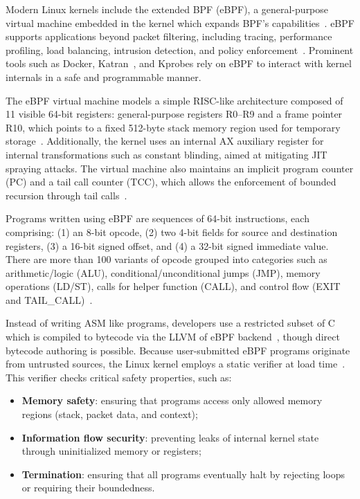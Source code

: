 \documentclass[sigconf]{acmart}
\begin{document}
Modern Linux kernels include the extended BPF (eBPF), a general-purpose virtual machine embedded in the kernel which expands BPF's capabilities~\cite{santos2019fast}. eBPF supports applications beyond packet filtering, including tracing, performance profiling, load balancing, intrusion detection, and policy enforcement~\cite{rice2023learning}. Prominent tools such as Docker, Katran~\cite{Katran}, and Kprobes rely on eBPF to interact with kernel internals in a safe and programmable manner.

The eBPF virtual machine models a simple RISC-like architecture composed of 11 visible 64-bit registers: general-purpose registers R0--R9 and a frame pointer R10, which points to a fixed 512-byte stack memory region used for temporary storage~\cite{kernel2024bpfdoc}. Additionally, the kernel uses an internal AX auxiliary register for internal transformations such as constant blinding, aimed at mitigating JIT spraying attacks. The virtual machine also maintains an implicit program counter (PC) and a tail call counter (TCC), which allows the enforcement of bounded recursion through tail calls~\cite{nelson2020specification}.

Programs written using eBPF are sequences of 64-bit instructions, each comprising: (1) an 8-bit opcode, (2) two 4-bit fields for source and destination registers, (3) a 16-bit signed offset, and (4) a 32-bit signed immediate value. There are more than 100 variants of opcode grouped into categories such as arithmetic/logic (ALU), conditional/unconditional jumps (JMP), memory operations (LD/ST), calls for helper function (CALL), and control flow (EXIT and TAIL\_CALL)~\cite{kernel2024bpfdoc}.

Instead of writing ASM like programs, developers use a restricted subset of C which is compiled to bytecode via the LLVM of eBPF backend~\cite{santos2019fast}, though direct bytecode authoring is possible. Because user-submitted eBPF programs originate from untrusted sources, the Linux kernel employs a static verifier at load time~\cite{nelson2020specification}. This verifier checks critical safety properties, such as:
\begin{itemize}
    \item \textbf{Memory safety}: ensuring that programs access only allowed memory regions (stack, packet data, and context);
    \item \textbf{Information flow security}: preventing leaks of internal kernel state through uninitialized memory or registers;
    \item \textbf{Termination}: ensuring that all programs eventually halt by rejecting loops or requiring their boundedness.
\end{itemize}
\end{document}
